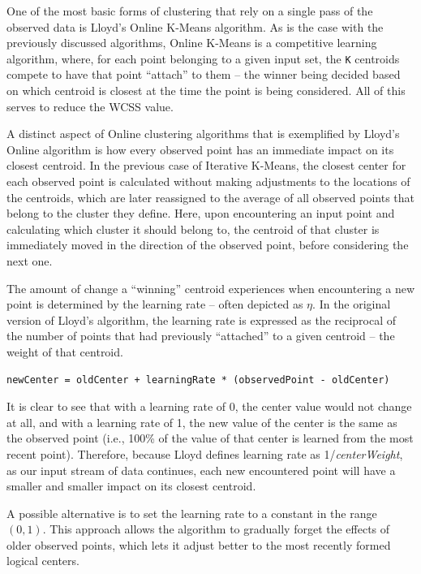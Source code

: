 \documentclass{l4proj}
\begin{document}
One of the most basic forms of clustering that rely on a single pass of the observed data is Lloyd's Online K-Means algorithm. As is the case with the previously discussed algorithms, Online K-Means is a competitive learning algorithm, where, for each point belonging to a given input set, the \texttt{K} centroids compete to have that point ``attach'' to them -- the winner being decided based on which centroid is closest at the time the point is being considered\cite{MLIntro}. All of this serves to reduce the WCSS value.

A distinct aspect of Online clustering algorithms that is exemplified by Lloyd's Online algorithm is how every observed point has an immediate impact on its closest centroid. In the previous case of Iterative K-Means, the closest center for each observed point is calculated without making adjustments to the locations of the centroids, which are later reassigned to the average of all observed points that belong to the cluster they define. Here, upon encountering an input point and calculating which cluster it should belong to, the centroid of that cluster is immediately moved in the direction of the observed point, before considering the next one.

The amount of change a ``winning'' centroid experiences when encountering a new point is determined by the learning rate -- often depicted as $\eta$. In the original version of Lloyd's algorithm, the learning rate is expressed as the reciprocal of the number of points that had previously ``attached'' to a given centroid -- the weight of that centroid. 

\begin{center}
\begin{BVerbatim}
newCenter = oldCenter + learningRate * (observedPoint - oldCenter)
\end{BVerbatim}
\end{center}

It is clear to see that with a learning rate of 0, the center value would not change at all, and with a learning rate of 1, the new value of the center is the same as the observed point (i.e., 100\% of the value of that center is learned from the most recent point). Therefore, because Lloyd defines learning rate as 1/\textit{centerWeight}, as our input stream of data continues, each new encountered point will have a smaller and smaller impact on its closest centroid.

A possible alternative is to set the learning rate to a constant in the range $(0,1)$. This approach allows the algorithm to gradually forget the effects of older observed points, which lets it adjust better to the most recently formed logical centers.
\end{document}

